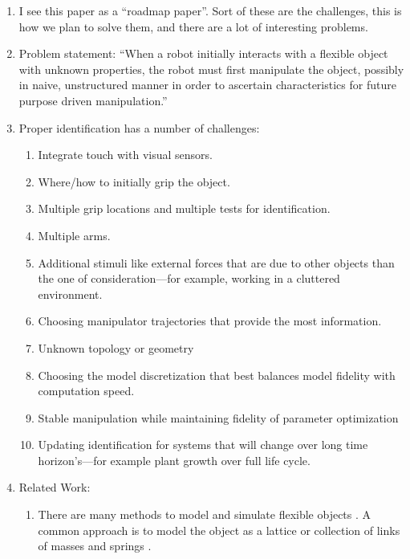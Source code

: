 \documentclass[runningheads,a4paper]{llncs}
\begin{document}
\begin{enumerate}
\item I see this paper as a ``roadmap paper''.  Sort of these are the challenges, this is how we plan to solve them, and there are a lot of interesting problems.
\item Problem statement: ``When a robot initially interacts with a flexible object with unknown properties, the robot must first manipulate the object, possibly in naive, unstructured manner in order to ascertain characteristics for future purpose driven manipulation.''
\item Proper identification has a number of challenges:
\begin{enumerate}
  \item Integrate touch with visual sensors.
  \item Where/how to initially grip the object.
  \item Multiple grip locations and multiple tests for identification.
  \item Multiple arms.
  \item Additional stimuli like external forces that are due to other objects than the one of consideration---for example, working in a cluttered environment.
  \item Choosing manipulator trajectories that provide the most information.
  \item Unknown topology or geometry
  \item Choosing the model discretization that best balances model fidelity with computation speed.
  \item Stable manipulation while maintaining fidelity of parameter optimization
  \item Updating identification for systems that will change over long time horizon's---for example plant growth over full life cycle.
\end{enumerate}
\item Related Work:
\begin{enumerate}
  \item There are many methods to model and simulate flexible objects \cite{khalil_payeur} \cite{lang_etal}.  A common approach is to model the object as a lattice or collection of links of masses and springs \cite{sahari_etal} \cite{wakamatsu_etal} \cite{khalil_payeur}.

\end{enumerate}
\end{enumerate}
\end{document}
